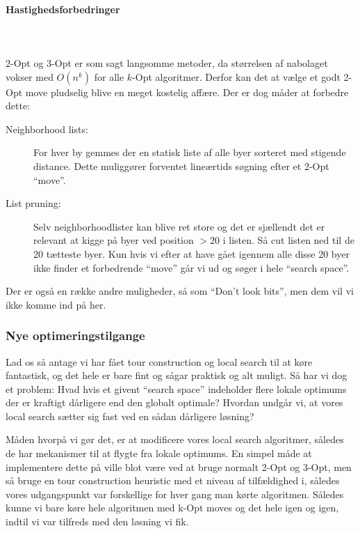 \paragraph{Hastighedsforbedringer}
~\\
~\\
2-Opt og 3-Opt er som sagt langsomme metoder, da størrelsen af nabolaget vokser med $O(n^k)$ for alle $k$-Opt algoritmer. Derfor kan det at vælge et godt 2-Opt move pludselig blive en meget kostelig affære. Der er dog måder at forbedre dette:

\begin{description}
 \item[Neighborhood lists:] For hver by gemmes der en statisk liste af alle byer sorteret med stigende distance. Dette muliggører forventet lineærtids søgning efter et 2-Opt ``move''.
 \item[List pruning:] Selv neighborhoodlister kan blive ret store og det er sjællendt det er relevant at kigge på byer ved position $> 20$ i listen. Så cut listen ned til de 20 tætteste byer. Kun hvis vi efter at have gået igennem alle disse 20 byer ikke finder et forbedrende ``move'' går vi ud og søger i hele ``search space''. 
\end{description}

Der er også en række andre muligheder, så som ``Don't look bits'', men dem vil vi ikke komme ind på her.

\subsubsection{Nye optimeringstilgange}

Lad os så antage vi har fået tour construction og local search til at køre fantastisk, og det hele er bare fint og sågar praktisk og alt muligt. Så har vi dog et problem: Hvad hvis et givent ``search space'' indeholder flere lokale optimums der er kraftigt dårligere end den globalt optimale? Hvordan undgår vi, at vores local search sætter sig fast ved en sådan dårligere løsning?

Måden hvorpå vi gør det, er at modificere vores local search algoritmer, således de har mekanismer til at flygte fra lokale optimums. En simpel måde at implementere dette på ville blot være ved at bruge normalt 2-Opt og 3-Opt, men så bruge en tour construction heuristic med et niveau af tilfældighed i, således vores udgangspunkt var forskellige for hver gang man kørte algoritmen. Således kunne vi bare køre hele algoritmen med k-Opt moves og det hele igen og igen, indtil vi var tilfreds med den løsning vi fik. 

